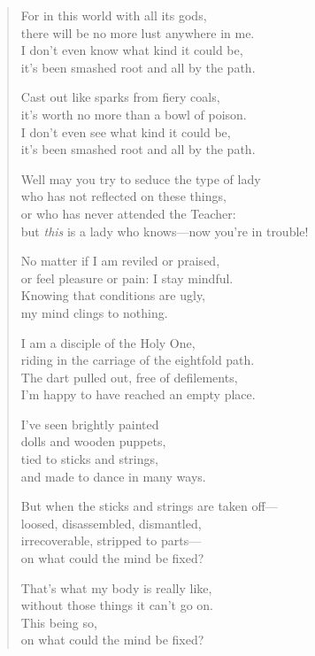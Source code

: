 \documentclass[12pt,openany]{book}%
\begin{document}
\begin{verse}
For in this world with all its gods, \\
there will be no more lust anywhere in me. \\
I don’t even know what kind it could be, \\
it’s been smashed root and all by the path. 

Cast out like sparks from fiery coals, \\
it’s worth no more than a bowl of poison. \\
I don’t even see what kind it could be, \\
it’s been smashed root and all by the path. 

Well may you try to seduce the type of lady \\
who has not reflected on these things, \\
or who has never attended the Teacher: \\
but \emph{this} is a lady who knows—now you’re in trouble! 

No matter if I am reviled or praised, \\
or feel pleasure or pain: I stay mindful. \\
Knowing that conditions are ugly, \\
my mind clings to nothing. 

I am a disciple of the Holy One, \\
riding in the carriage of the eightfold path. \\
The dart pulled out, free of defilements, \\
I’m happy to have reached an empty place. 

I’ve seen brightly painted \\
dolls and wooden puppets, \\
tied to sticks and strings, \\
and made to dance in many ways. 

But when the sticks and strings are taken off—\\
loosed, disassembled, dismantled, \\
irrecoverable, stripped to parts—\\
on what could the mind be fixed? 

That’s what my body is really like, \\
without those things it can’t go on. \\
This being so, \\
on what could the mind be fixed? 


\end{verse}
\end{document}
